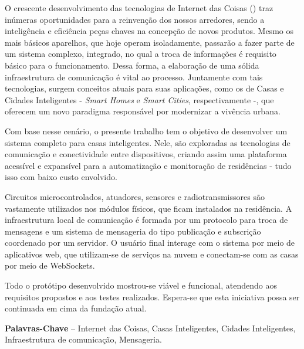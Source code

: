 \begin{resumo}
O crescente desenvolvimento das tecnologias de Internet das Coisas (\wiot) traz inúmeras oportunidades para a reinvenção dos nossos arredores, sendo a inteligência e eficiência peças chaves na concepção de novos produtos. Mesmo os mais básicos aparelhos, que hoje operam isoladamente, passarão a fazer parte de um sistema complexo, integrado, no qual a troca de informações é requisito básico para o funcionamento. Dessa forma, a elaboração de uma sólida infraestrutura de comunicação é vital ao processo. Juntamente com tais tecnologias, surgem conceitos atuais para suas aplicações, como os de Casas e Cidades Inteligentes - \textit{Smart Homes} e \textit{Smart Cities}, respectivamente -, que oferecem um novo paradigma responsável por modernizar a vivência urbana.

Com base nesse cenário, o presente trabalho tem o objetivo de desenvolver um sistema completo para casas inteligentes. Nele, são exploradas as tecnologias de comunicação e conectividade entre dispositivos, criando assim uma plataforma acessível e expansível para a automatização e monitoração de residências - tudo isso com baixo custo envolvido.

Circuitos microcontrolados, atuadores, sensores e radiotransmissores são vastamente utilizados nos módulos físicos, que ficam instalados na residência. A infraestrutura local de comunicação é formada por um protocolo para troca de mensagens e um sistema de mensageria do tipo publicação e subscrição coordenado por um servidor. O usuário final interage com o sistema por meio de aplicativos web, que utilizam-se de serviços na nuvem e conectam-se com as casas por meio de WebSockets.

Todo o protótipo desenvolvido mostrou-se viável e funcional, atendendo aos requisitos propostos e aos testes realizados. Espera-se que esta iniciativa possa ser continuada em cima da fundação atual.

%
\textbf{Palavras-Chave} -- Internet das Coisas, Casas Inteligentes, Cidades Inteligentes, Infraestrutura de comunicação, Mensageria.
\end{resumo}
